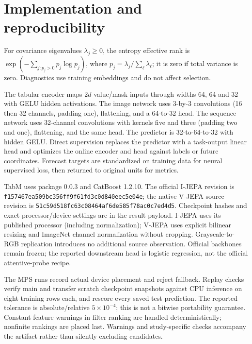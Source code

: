 \documentclass{article}
\begin{document}
\section{Implementation and reproducibility}\label{app:implementation}
For covariance eigenvalues $\lambda_j\geq0$, the entropy effective rank is $\exp(-\sum_{j:p_j>0}p_j\log p_j)$, where $p_j=\lambda_j/\sum_\ell\lambda_\ell$; it is zero if total variance is zero. Diagnostics use training embeddings and do not affect selection.

The tabular encoder maps $2d$ value/mask inputs through widths 64, 64 and 32 with GELU hidden activations. The image network uses 3-by-3 convolutions (16 then 32 channels, padding one), flattening, and a 64-to-32 head. The sequence network uses 32-channel convolutions with kernels five and three (padding two and one), flattening, and the same head. The predictor is 32-to-64-to-32 with hidden GELU. Direct supervision replaces the predictor with a task-output linear head and optimizes the online encoder and head against labels or future coordinates. Forecast targets are standardized on training data for neural supervised loss, then returned to original units for metrics.

TabM uses package 0.0.3 and CatBoost 1.2.10. The official I-JEPA revision is \texttt{f157467ea509bc356ff9\allowbreak{}f61fd3c0d840eec5e04e}; the native V-JEPA source revision is \texttt{51c59d518fc63c08464a\allowbreak{}f6de585f78ac0c7ed4d5}. Checkpoint hashes and exact processor/device settings are in the result payload. I-JEPA uses its published processor (including normalization); V-JEPA uses explicit bilinear resizing and ImageNet channel normalization without cropping. Grayscale-to-RGB replication introduces no additional source observation. Official backbones remain frozen; the reported downstream head is logistic regression, not the official attentive-probe recipe.

The MPS runs record actual device placement and reject fallback. Replay checks verify \ExtCheckpoints{} main and \VisionCheckpoints{} transfer scratch checkpoint snapshots against CPU inference on eight training rows each, and rescore every saved test prediction. The reported tolerance is absolute/relative $5\times10^{-4}$; this is not a bitwise portability guarantee. Constant-feature warnings in filter ranking are handled deterministically; nonfinite rankings are placed last. Warnings and study-specific checks accompany the artifact rather than silently excluding candidates.
\end{document}
